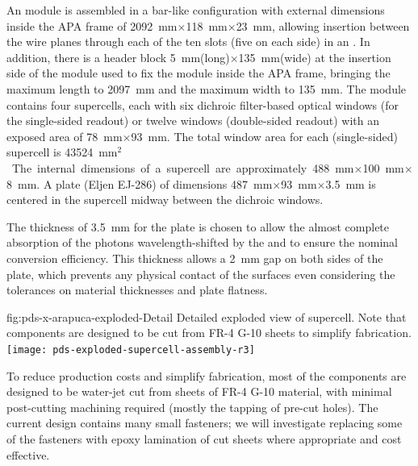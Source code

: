 An  module is assembled in a bar-like configuration with external dimensions inside the APA frame of \SI{2092}{mm}$\times$\SI{118}{mm}$\times$\SI{23}{mm},  allowing insertion between the wire planes through each of the ten slots (five on each side) in an . In addition, there is a header block \SI{5}{mm}(long)$\times$\SI{135}{mm}(wide) at the insertion side of the module used to fix the module inside the APA frame, bringing the maximum length to \SI{2097}{mm} and the maximum width to \SI{135}{mm}.
The module contains four  supercells, each with six dichroic filter-based optical windows (for the single-sided readout) or twelve windows (double-sided readout) with an exposed area of \SI{78}{mm}$\times$\SI{93}{mm}.  
The total window area for each (single-sided) supercell  is \SI{43524}{mm$^2$}.
The internal dimensions of a supercell are approximately \SI{488}{mm}$\times$\SI{100}{mm}$\times$\SI{8}{mm}. A  plate (Eljen EJ-286) of dimensions \SI{487}{mm}$\times$\SI{93}{mm}$\times$\SI{3.5}{mm} is centered in the supercell midway between the dichroic windows. 

The thickness of \SI{3.5}{mm} for the plate is chosen to allow the almost complete absorption of the photons wavelength-shifted by the  and to ensure the nominal conversion efficiency. This thickness allows a \SI{2}{mm}  gap on both sides of the plate, which prevents any physical contact of the surfaces even considering the tolerances on material thicknesses and plate flatness.   

\begin{dunefigure}{fig:pds-x-arapuca-exploded-Detail}
{Detailed exploded view of  supercell. Note that components are designed to be cut from FR-4 G-10 sheets to simplify fabrication.}
   \texttt{[image: pds-exploded-supercell-assembly-r3]}
\end{dunefigure}

To reduce production costs and simplify fabrication, most of the  components are designed to be water-jet cut from sheets of FR-4 G-10 material, with minimal post-cutting machining required (mostly the tapping of pre-cut holes).  The current design contains many small fasteners; we will investigate replacing some of the fasteners with epoxy lamination of cut sheets where appropriate and cost effective.


